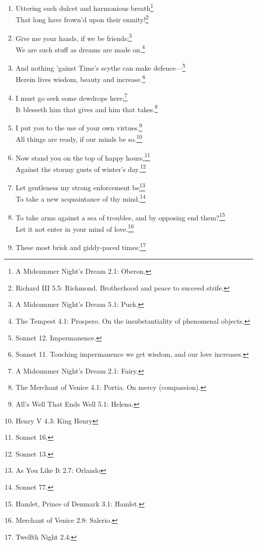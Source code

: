 \documentclass[17pt,twoside]{extarticle}
\begin{document}
\begin{enumerate}
  Study is like the heaven's glorious sun,\footnote{Love's Labour Lost
    1.1: Berowne. True study brings clarity.}\\Which touch'd the very
  virtue of compassion in thee.\footnote{The Tempest 1.2: Prospero.}
\item
  Uttering such dulcet and harmonious breath\footnote{A Midsummer
    Night's Dream 2.1: Oberon.}\\That long have frown'd upon their
  enmity!\footnote{Richard III 5.5: Richmond. Brotherhood and peace to
    succeed strife.}
\item
  Give me your hands, if we be friends;\footnote{A Midsummer Night's
    Dream 5.1: Puck.}\\We are such stuff as dreams are made
  on.\footnote{The Tempest 4.1: Prospero. On the insubstantiality of
    phenomenal objects.}
\item
  And nothing 'gainst Time's scythe can make defence---\footnote{Sonnet
    12. Impermanence.}\\Herein lives wisdom, beauty and
  increase.\footnote{Sonnet 11. Touching impermanence we get wisdom, and
    our love increases.}
\item
  I must go seek some dewdrops here;\footnote{A Midsummer Night's Dream
    2.1: Fairy.}\\It blesseth him that gives and him that
  takes.\footnote{The Merchant of Venice 4.1: Portia. On mercy
    (compassion).}
\item
  I put you to the use of your own virtues.\footnote{All's Well That
    Ends Well 5.1: Helena.}\\All things are ready, if our minds be
  so.\footnote{Henry V 4.3: King Henry}
\item
  Now stand you on the top of happy hours,\footnote{Sonnet 16.}\\Against
  the stormy gusts of winter's day.\footnote{Sonnet 13.}
\item
  Let gentleness my strong enforcement be\footnote{As You Like It 2.7:
    Orlando}\\To take a new acquaintance of thy mind.\footnote{Sonnet
    77.}
\item
  To take arms against a sea of troubles, and by opposing end
  them?\footnote{Hamlet, Prince of Denmark 3.1: Hamlet.}\\Let it not
  enter in your mind of love.\footnote{Merchant of Venice 2.8: Salerio.}
\item
  These most brisk and giddy-paced times:\footnote{Twelfth Night 2.4:
}
\end{enumerate}
\end{document}
